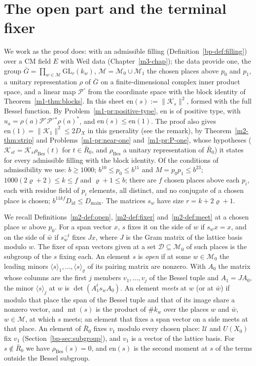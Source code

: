 \documentclass[reqno]{amsart}
\newcounter{chap}
\theoremstyle{definition}
\theoremstyle{plain}
\theoremstyle{remark}
\newcommand{\GL}{\mathrm{GL}}
\newcommand{\Gb}{\bar G}
\newcommand{\Rb}{\bar R_0}
\newcommand{\Pco}{{\mathcal P^\circ}}
\newcommand{\Kc}{\mathcal K}
\newcommand{\Uc}{\mathcal U}
\newcommand{\Dc}{\mathcal D}
\newcommand{\Mch}{\mathcal M}
\newcommand{\en}{\mathrm{en}}
\newcommand{\Did}{D_{\mathrm{id}}}
\newcommand{\Dmain}{D_{\mathrm{main}}}
\newcommand{\mt}{\operatorname{mt}}
\newcommand{\rBes}{\rho_{\mathrm{Bes}}}
\begin{document}
\section{The open part and the terminal fixer}\label{sec:fixers}

We work as the proof does: with an admissible filling (Definition~\ref{bp-def:filling}) over a CM field \(E\) with Weil data (Chapter~\ref{m3-chap}); the data provide one, the group \(\Gb=\prod_{w\in\Mch}\GL_r(k_w)\), \(\Mch=\Mch_0\cup\Mch_1\) the chosen places above \(p_0\) and \(p_1\), a unitary representation \(\rho\) of \(\Gb\) on a finite-dimensional complex inner product space, and a linear map \(\Pco\) from the coordinate space with the block identity of Theorem~\ref{m1-thm:blocks}.  In this sheet \(\en(s):=\lVert\Kc_s\rVert^2\), formed with the full Bessel function.  By Problem~\ref{m1-pr:positive-type}, \(\en\) is of positive type, with \(u_a=\rho(a)\Pco\Pco{}^*\rho(a)^*\), and \(\en(s)\le\en(1)\).  The proof also gives \(\en(1)=\lVert\Kc_1\rVert^2\le2D_X\) in this generality (see the remark), by Theorem~\ref{m2-thm:strip} and Problems~\ref{m1-pr:near-one} and~\ref{m1-pr:P-one}, whose hypotheses (\(\Kc_{st}=\Kc_s\rBes(t)\) for \(t\in\Rb\), and \(\rBes\) a unitary representation of \(\Rb\)) it states for every admissible filling with the block identity.  Of the conditions of admissibility we use: \(b\ge1000\); \(b^{10}\le p_0\le b^{11}\) and \(M=p_0p_1\le b^{23}\); \(1000(2\varrho+2)\le k\le f\) and \(\varrho+1\le b\); there are \(f\) chosen places above each \(p_i\), each with residue field of \(p_i\) elements, all distinct, and no conjugate of a chosen place is chosen; \(b^{11kf}\Did\le\Dmain\).  The matrices \(s_w\) have size \(r=k+2\varrho+1\).

We recall Definitions~\ref{m2-def:open}, \ref{m2-def:fixer} and~\ref{m2-def:meet} at a chosen place \(w\) above \(p_0\).  For a span vector \(x\), \(s\) fixes it on the side of \(w\) if \(s_wx=x\), and on the side of \(\bar w\) if \(s_w^{-t}\) fixes \(Jx\), where \(J\) is the Gram matrix of the lattice basis modulo \(w\).  The fixer of span vectors given at a set \(\Dc\subseteq\Mch_0\) of such places is the subgroup of the \(s\) fixing each.  An element \(s\) is \emph{open} if at some \(w\in\Mch_0\) the leading minors \(\langle s\rangle_1,\dots,\langle s\rangle_\varrho\) of its pairing matrix are nonzero.  With \(A_0\) the matrix whose columns are the first \(j\) members \(v_1,\dots,v_j\) of the Bessel tuple and \(A_1=JA_0\), the minor \(\langle s\rangle_j\) at \(w\) is \(\det(A_1^ts_wA_0)\).  An element \emph{meets} at \(w\) (or at \(\bar w\)) if modulo that place the span of the Bessel tuple and that of its image share a nonzero vector, and \(\mt(s)\) is the product of \(\#k_w\) over the places \(w\) and \(\bar w\), \(w\in\Mch\), at which \(s\) meets; an element that fixes a span vector on a side meets at that place.  An element of \(\Rb\) fixes \(v_1\) modulo every chosen place: \(\Uc\) and \(U(X_0)\) fix \(v_1\) (Section~\ref{bp-sec:subgroup}), and \(v_1\) is a vector of the lattice basis.  For \(s\notin\Rb\) we have \(\rBes(s)=0\), and \(\en(s)\) is the second moment at \(s\) of the terms outside the Bessel subgroup.
\end{document}

